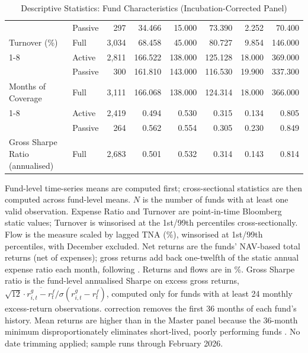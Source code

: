\begin{table}[H]
{\begin{tabular}[t]{llrrrrrr}
 & Passive & 297 & 34.466 & 15.000 & 73.390 & 2.252 & 70.400\\

\multirow{-3}{*}{\raggedright\arraybackslash Turnover (\%)} & Full & 3,034 & 68.458 & 45.000 & 80.727 & 9.854 & 146.000\\
\cmidrule{1-8}
 & Active & 2,811 & 166.522 & 138.000 & 125.128 & 18.000 & 369.000\\

 & Passive & 300 & 161.810 & 143.000 & 116.530 & 19.900 & 337.300\\

\multirow{-3}{*}{\raggedright\arraybackslash Months of Coverage} & Full & 3,111 & 166.068 & 138.000 & 124.314 & 18.000 & 366.000\\
\cmidrule{1-8}
 & Active & 2,419 & 0.494 & 0.530 & 0.315 & 0.134 & 0.805\\

 & Passive & 264 & 0.562 & 0.554 & 0.305 & 0.230 & 0.849\\

\multirow{-3}{*}{\raggedright\arraybackslash Gross Sharpe Ratio (annualised)} & Full & 2,683 & 0.501 & 0.532 & 0.314 & 0.143 & 0.814\\
\bottomrule
\end{tabular}%
}
\setlength{\tabletempwidth}{\wd\tabletempbox}
\ifdim\tabletempwidth>\linewidth\setlength{\tabletempwidth}{\linewidth}\fi
\begin{minipage}{\tabletempwidth}
\captionsetup{width=\linewidth}
\caption{\label{tab:desc_stats}Descriptive Statistics: Fund Characteristics (Incubation-Corrected Panel)}
\ifdim\wd\tabletempbox>\linewidth
  \resizebox{\linewidth}{!}{\usebox{\tabletempbox}}
\else
  \usebox{\tabletempbox}
\fi
\par\medskip
\begin{singlespace}\footnotesize\noindent
Fund-level time-series means are computed first; cross-sectional statistics are then computed across fund-level means. $N$ is the number of funds with at least one valid observation. Expense Ratio and Turnover are point-in-time Bloomberg static values; Turnover is winsorised at the 1st/99th percentiles cross-sectionally. Flow is the \textcite{SirriTufano1998} measure scaled by lagged TNA (\%), winsorised at 1st/99th percentiles, with December excluded. Net returns are the funds' NAV-based total returns (net of expenses); gross returns add back one-twelfth of the static annual expense ratio each month, following \textcite{FamaFrench2010}. Returns and flows are in \%. Gross Sharpe ratio is the fund-level annualised Sharpe on excess gross returns, $\sqrt{12}\cdot\overline{r^{g}_{i,t}-r^{f}_{t}}/\sigma(r^{g}_{i,t}-r^{f}_{t})$, computed only for funds with at least 24 monthly excess-return observations. \textcite{Evans2010} correction removes the first 36 months of each fund's history. Mean returns are higher than in the Master panel because the 36-month minimum disproportionately eliminates short-lived, poorly performing funds \parencite{Evans2010}. No date trimming applied; sample runs through February 2026.
\end{singlespace}
\end{minipage}
\end{table}

